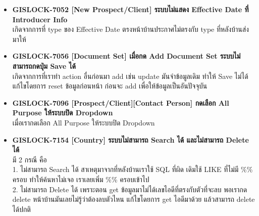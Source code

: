 \begin{itemize}
    \item \textbf{{GISLOCK-7052 [New Prospect/Client] ระบบไม่แสดง Effective Date ที่ Introducer Info}} \\
          เกิดจากการที่ type ของ Effective Date ตรงหน้าบ้านประกาศไม่ตรงกับ type ที่หลังบ้านส่งมาให้
    \item \textbf{{GISLOCK-7056 [Document Set] เมื่อกด Add Document Set ระบบไม่สามารถกดปุ่ม Save ได้}} \\
          เกิดจากการที่เราทำ action อื่นก่อนมา add เช่น update มันจำข้อมูลเดิม ทำให้ Save ไม่ได้ แก้ไขโดยการ reset ข้อมูลก่อนหน้า ก่อนจะ add เพื่อให้ข้อมูลเป็นอันปัจจุบัน
    \item \textbf{{GISLOCK-7096 [Prospect/Client][Contact Person] กดเลือก All Purpose ให้ระบบปิด Dropdown}} \\
          เมื่อเรากดเลือก All Purpose ให้ระบบปิด Dropdown
    \item \textbf{{GISLOCK-7154 [Country] ระบบไม่สามารถ Search ได้ และไม่สามารถ Delete ได้}} \\
          มี 2 กรณี คือ \\
          1. ไม่สามารถ Search ได้ สาเหตุมาจากที่หลังบ้านเราใช้ SQL ที่ผิด เดิมใช้ LIKE ที่ไม่มี \%\% ครอบ ทำให้ค้นหาไม่เจอ เราเลยเพิ่ม \%\% ครอบเข้าไป \\ 
          2. ไม่สามารถ Delete ได้ เพราะตอน get ข้อมูลมาไม่ได้เลขไอดีที่ตรงกับตัวที่จะลบ พอเรากด delete หน้าบ้านมันเลยไม่รู้ว่าต้องลบตัวไหน แก้ไขโดยการ get ไอดีมาด้วย แล้วสามารถ delete ได้ปกติ
\end{itemize}

